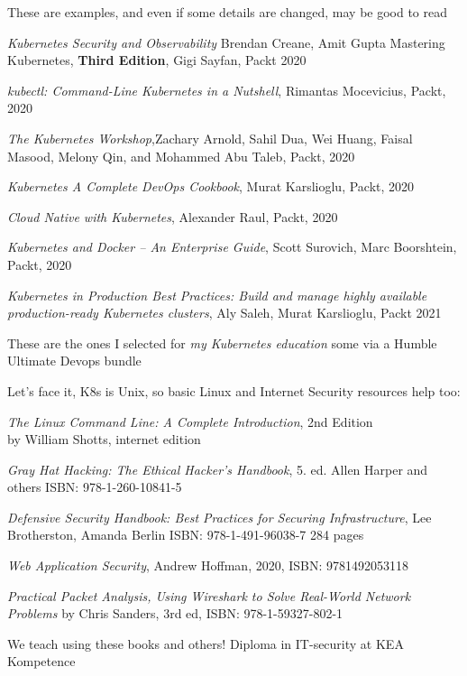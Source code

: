 \documentclass[Screen16to9,17pt]{foils}
\begin{document}
These are examples, and even if some details are changed, may be good to read
\begin{list2}
\item \emph{Kubernetes Security and Observability} Brendan Creane, Amit Gupta %
Mastering Kubernetes, {\bf Third Edition}, Gigi Sayfan, Packt 2020
\item \emph{kubectl: Command-Line Kubernetes in a Nutshell}, Rimantas Mocevicius, Packt, 2020
\item \emph{The Kubernetes Workshop},Zachary Arnold, Sahil Dua, Wei Huang, Faisal Masood, Melony Qin,
and Mohammed Abu Taleb, Packt, 2020
\item \emph{Kubernetes A Complete DevOps Cookbook}, Murat Karslioglu, Packt, 2020
\item \emph{Cloud Native with Kubernetes}, Alexander Raul, Packt, 2020
\item \emph{Kubernetes and Docker – An Enterprise Guide}, Scott Surovich, Marc Boorshtein, Packt, 2020
\item \emph{Kubernetes in Production Best Practices: Build and manage highly available production-ready
Kubernetes clusters}, Aly Saleh, Murat Karslioglu, Packt 2021
\end{list2}

These are the ones I selected for \emph{my Kubernetes education} some via a Humble Ultimate Devops bundle


Let's face it, K8s is Unix, so basic Linux and Internet Security resources help too:
\begin{list2}
\item \emph{The Linux Command Line: A Complete Introduction}, 2nd Edition\\
 by William Shotts, internet edition 
\item \emph{Gray Hat Hacking: The Ethical Hacker's Handbook}, 5. ed. Allen Harper and others ISBN: 978-1-260-10841-5
\item \emph{Defensive Security Handbook: Best Practices for Securing Infrastructure}, Lee Brotherston, Amanda Berlin ISBN: 978-1-491-96038-7 284 pages
\item \emph{Web Application Security}, Andrew Hoffman, 2020, ISBN: 9781492053118
\item \emph{Practical Packet Analysis, Using Wireshark to Solve Real-World Network Problems}
by Chris Sanders, 3rd ed, ISBN: 978-1-59327-802-1
\end{list2}

We teach using these books and others! Diploma in IT-security at KEA Kompetence\\
\end{document}

